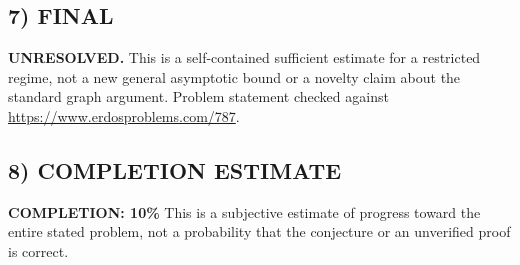 \subsection*{7) FINAL}
\textbf{UNRESOLVED.} This is a self-contained sufficient estimate for a restricted regime, not a new general asymptotic bound or a novelty claim about the standard graph argument.
\noindent Problem statement checked against \url{https://www.erdosproblems.com/787}.

\subsection*{8) COMPLETION ESTIMATE}
\textbf{COMPLETION: 10\%}
This is a subjective estimate of progress toward the entire stated problem, not a probability that the conjecture or an unverified proof is correct.
